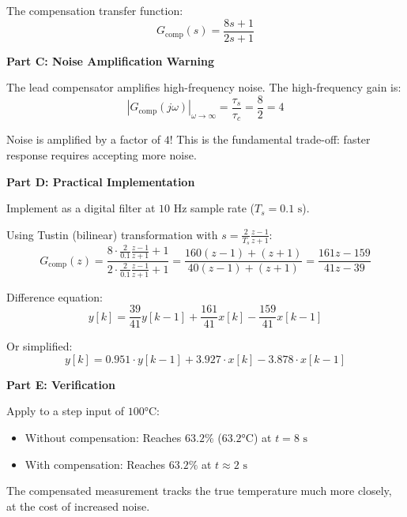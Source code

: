 \begin{example}
The compensation transfer function:
\begin{equation}
G_{\text{comp}}(s) = \frac{8s + 1}{2s + 1}
\end{equation}

\textbf{Part C: Noise Amplification Warning}

The lead compensator amplifies high-frequency noise. The high-frequency gain is:
\begin{equation}
|G_{\text{comp}}(j\omega)|_{\omega \to \infty} = \frac{\tau_s}{\tau_c} = \frac{8}{2} = 4
\end{equation}

Noise is amplified by a factor of $4$! This is the fundamental trade-off: faster response requires accepting more noise.

\textbf{Part D: Practical Implementation}

Implement as a digital filter at $10\text{ Hz}$ sample rate ($T_s = 0.1\text{ s}$).

Using Tustin (bilinear) transformation with $s = \frac{2}{T_s}\frac{z-1}{z+1}$:
\begin{equation}
G_{\text{comp}}(z) = \frac{8 \cdot \frac{2}{0.1}\frac{z-1}{z+1} + 1}{2 \cdot \frac{2}{0.1}\frac{z-1}{z+1} + 1} = \frac{160(z-1) + (z+1)}{40(z-1) + (z+1)} = \frac{161z - 159}{41z - 39}
\end{equation}

Difference equation:
\begin{equation}
y[k] = \frac{39}{41}y[k-1] + \frac{161}{41}x[k] - \frac{159}{41}x[k-1]
\end{equation}

Or simplified:
\begin{equation}
y[k] = 0.951 \cdot y[k-1] + 3.927 \cdot x[k] - 3.878 \cdot x[k-1]
\end{equation}

\textbf{Part E: Verification}

Apply to a step input of $100°\text{C}$:
\begin{itemize}
    \item Without compensation: Reaches $63.2\%$ ($63.2°\text{C}$) at $t = 8\text{ s}$
    \item With compensation: Reaches $63.2\%$ at $t \approx 2\text{ s}$
\end{itemize}

The compensated measurement tracks the true temperature much more closely, at the cost of increased noise.
\end{example}

